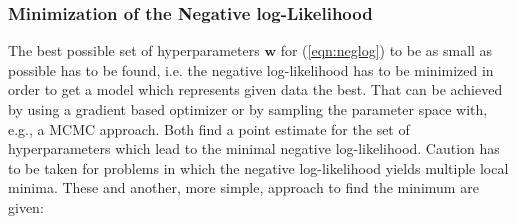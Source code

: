 \documentclass[%
  a4paper,oneside,%
  11pt,%
  smallchapters,
  style=printdev,
  extramargin,
  green,%
  rgb, <cmyk>
  ]{tubsbook}
\begin{document}
\subsubsection{Minimization of the Negative log-Likelihood}
The best possible set of hyperparameters $\bm{w}$ for (\ref{eqn:neglog}) to be as small as possible has to be found, i.e. the negative log-likelihood has to be minimized in order to get a model which represents given data the best. That can be achieved by using a gradient based optimizer or by sampling the parameter space with, e.g., a MCMC approach. Both find a point estimate for the set of hyperparameters which lead to the minimal negative log-likelihood. Caution has to be taken for problems in which the negative log-likelihood yields multiple local minima. \cite{Svensson2015} These and another, more simple, approach to find the minimum are given:
\end{document}
